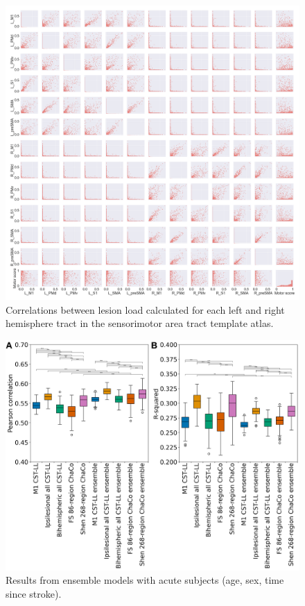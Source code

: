 \documentclass[10pt]{article}
\begin{document}
\begin{figure}[ht]
\centering
\includegraphics[width=1\linewidth]{figures/SMATT_bi_scatterplts.png}
\caption{Correlations between lesion load calculated for each left and right hemisphere tract in the sensorimotor area tract template atlas.}
\label{smatt_pairwise_correlations_bi}
\end{figure}




\begin{figure}[ht]
\centering
\includegraphics[width=1\linewidth]{figures/Analysis7.png}
\caption{Results from ensemble models with acute subjects (age, sex, time since stroke).}
\label{ensemble}
\end{figure}
\end{document}
